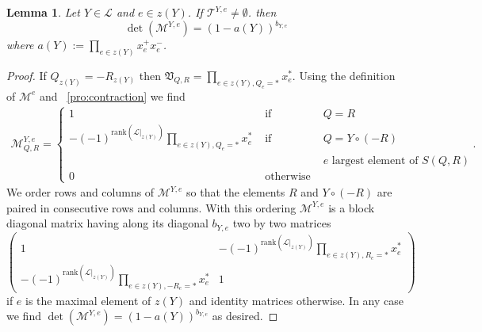 \documentclass[12pt]{amsart}
\def\Var{{\mathfrak V}}
\def\Tscr{{\mathcal T}}
\def\rank{{\mathrm{rank}}}
\theoremstyle{plain}
\newtheorem{Lemma}{Lemma}
\numberwithin{Lemma}{\DefaultNumberTheoremWithin}
\numberwithin{Claim}{\DefaultNumberTheoremWithin}
\numberwithin{Theorem}{\DefaultNumberTheoremWithin}
\numberwithin{Corollary}{\DefaultNumberTheoremWithin}
\numberwithin{Proposition}{\DefaultNumberTheoremWithin}
\numberwithin{Conjecture}{\DefaultNumberTheoremWithin}
\numberwithin{Situation}{\DefaultNumberTheoremWithin}
\numberwithin{Note}{\DefaultNumberTheoremWithin}
\theoremstyle{definition}
\numberwithin{Definition}{\DefaultNumberTheoremWithin}
\theoremstyle{definition}
\numberwithin{Question}{\DefaultNumberTheoremWithin}
\theoremstyle{definition}
\numberwithin{Problem}{\DefaultNumberTheoremWithin}
\theoremstyle{remark} \newtheorem{Remark}{Remark}
\numberwithin{Remark}{\DefaultNumberTheoremWithin}
\theoremstyle{remark}
\numberwithin{Example}{\DefaultNumberTheoremWithin}
\numberwithin{Case}{Lemma}
\numberwithin{Step}{Lemma}
\begin{document}
\begin{Lemma}
  \label{lem:formula}
  Let $Y \in \mathcal{L}$ and $e \in z(Y)$.
  If $\Tscr^{Y,e} \neq \emptyset$. 
  then 
  $$\det(\mathcal{M}^{Y,e}) = (1-a(Y))^{b_{Y,e}}$$
  where $a(Y) := \prod_{e \in z(Y)} x_{e}^+ x_{e}^-$.
\end{Lemma}
\begin{proof}
If $Q_{z(Y)} = -R_{z(Y)}$ then $\Var_{Q,R} = \prod_{e \in z(Y), Q_e = *} x_{e}^*$.
  Using the definition of $\mathcal{M}^e$ and ~\ref{pro:contraction} we find
  \begin{eqnarray*} 
    \mathcal{M}^{Y,e}_{Q,R} = 
       \left\{ 
          \begin{array}{ccc} 
                             1 & \mbox{~if~} & Q = R \\ 
             -(-1)^{\rank(\mathcal{L}|_{z(Y)})} \prod_{e \in z(Y), Q_e = *} x_{e}^* & \mbox{~if~} & Q = Y \circ (-R) \\
                                       &             & e \mbox{ largest element of } S(Q,R) \\
                             0 & \mbox{~otherwise~} & 
          \end{array} \right. .
  \end{eqnarray*} 
  We order rows and columns of $\mathcal{M}^{Y,e}$ so that the elements 
  $R$ and $Y \circ (-R)$ are  
  paired in consecutive rows and columns.
  With this ordering $\mathcal{M}^{Y,e}$ is a block diagonal
  matrix having along its diagonal $b_{Y,e}$ two by two matrices 
  $$\left( \begin{array}{cc}
        1                         & -(-1)^{\rank(\mathcal{L}|_{z(Y)})} \prod_{e \in z(Y), R_e = *} x_{e}^* \\
        -(-1)^{\rank(\mathcal{L}|_{z(Y)})} \prod_{e \in z(Y), -R_e = *} x_{e}^* & 1 
           \end{array} \right)
  $$
  if $e$ is the maximal element of $z(Y)$ and 
  identity matrices otherwise.  In any case we find
  $\det(\mathcal{M}^{Y,e}) = (1-a(Y))^{b_{Y,e}}$ as desired.
\end{proof}
\end{document}
